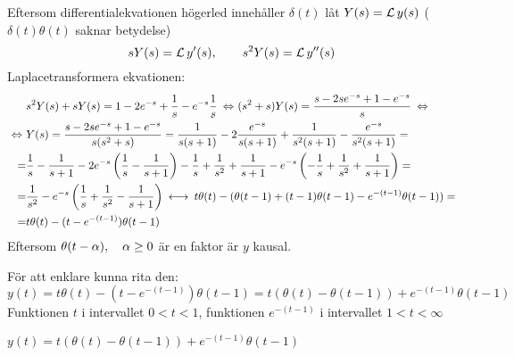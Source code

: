 \pagebreak
\begin{task}{5.11}
	Eftersom differentialekvationen högerled innehåller $\delta(t)$ låt $Y(s)=\operatorname{\mathcal{L}} y(s)$ ($\delta(t)\theta(t)$ saknar betydelse)
	\[sY(s)=\operatorname{\mathcal{L}} y'(s),\qquad s^2Y(s)=\operatorname{\mathcal{L}} y''(s)\]
	Laplacetransformera ekvationen:
	\begin{align*}
	&s^2Y(s)+sY(s)=1-2e^{-s}+\frac{1}{s}-e^{-s}\frac{1}{s} \lra
	(s^2+s)Y(s)=\frac{s-2se^{-s}+1-e^{-s}}{s}\lra \\ \lra
	&Y(s)=\frac{s-2se^{-s}+1-e^{-s}}{s(s^2+s)}=
	\frac{1}{s(s+1)}-2\frac{e^{-s}}{s(s+1)}+\frac{1}{s^2(s+1)}-\frac{e^{-s}}{s^2(s+1)}= \\ =
	&\frac{1}{s}-\frac{1}{s+1}-2e^{-s}\left(\frac{1}{s}-\frac{1}{s+1}\right)-\frac{1}{s}+\frac{1}{s^2}+\frac{1}{s+1}-e^{-s}\left(-\frac{1}{s}+\frac{1}{s^2}+\frac{1}{s+1}\right)= \\ =
	&\frac{1}{s^2}-e^{-s}\left(\frac{1}{s}+\frac{1}{s^2}-\frac{1}{s+1}\right) \llra
	t\theta(t)-(\theta(t-1)+(t-1)\theta(t-1)-e^{-(t-1)}\theta(t-1))= \\ =
	&t\theta(t)-(t-e^{-(t-1)})\theta(t-1)
	\end{align*}
	Eftersom $\theta(t-\alpha), \quad \alpha \ge 0$ är en faktor är $y$ kausal.
	
	För att enklare kunna rita den:
	\[y(t)=t\theta(t)-(t-e^{-(t-1)})\theta(t-1)=t(\theta(t)-\theta(t-1))+e^{-(t-1)}\theta(t-1)\]
	Funktionen $t$ i intervallet $0<t<1$, funktionen $e^{-(t-1)}$ i intervallet $1<t<\infty$
	
	\ans $y(t)=t(\theta(t)-\theta(t-1))+e^{-(t-1)}\theta(t-1)$
\end{task}

